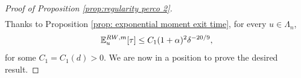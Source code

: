 \documentclass[11pt,a4paper]{article}
\numberwithin{equation}{section}
\theoremstyle{plain}
\theoremstyle{definition}
\begin{document}
\begin{proof}[Proof of Proposition \textup{\ref{prop:regularity perco 2}}]
\begin{multline}
\end{multline}
Thanks to Proposition \ref{prop: exponential moment exit time}, for every $u\in \Lambda_n$,
\begin{equation}\label{eq:proof propreg2 2}
	\mathbb E_u^{{\rm RW},m}[\tau]\leq C_1(1+\alpha)^2\delta^{-20/9},
\end{equation}
for some $C_1=C_1(d)>0$.
%
We are now in a position to prove the desired result.


\end{proof}
\end{document}

